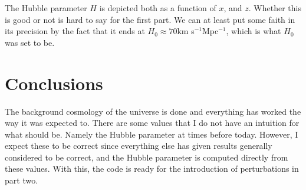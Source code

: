 \documentclass{aa}   %
\begin{document}
 The Hubble parameter $H$ is depicted both as a function of $x$, and $z$. Whether this is good or not is hard to say for the first part. We can at least put some faith in its precision by the fact that it ends at $H_0 \approx 70$km s$^{-1}$Mpc$^{-1}$, which is what $H_0$ was set to be. 
 
%  
% 

\section{Conclusions} \label{sec:conclusions}
The background cosmology of the universe is done and everything has worked the way it was expected to.
There are some values that I do not have an intuition for what should be. Namely the Hubble parameter at times before today. However, I expect these to be correct since everything else has given results generally considered to be correct, and the Hubble parameter is computed directly from these values.
With this, the code is ready for the introduction of perturbations in part two. 
\end{document}
